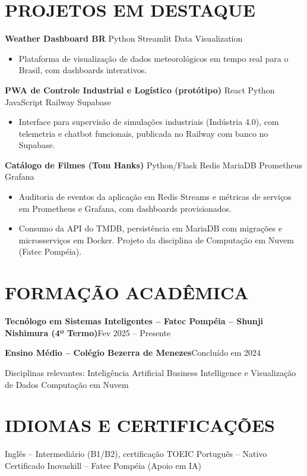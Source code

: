 \documentclass[9pt,a4paper]{extarticle}
\newcommand{\entry}[2]{\vspace{2pt}\noindent\textbf{#1}\hfill{\color{gray}#2}\par}
\newcommand{\projtitle}[2]{\vspace{2pt}\noindent\textbf{#1} {\color{gray}\textperiodcentered{} #2}\par}
\begin{document}
\section*{PROJETOS EM DESTAQUE}
\projtitle{Weather Dashboard BR}{Python \textperiodcentered{} Streamlit \textperiodcentered{} Data Visualization}
\begin{itemize}
  \item Plataforma de visualização de dados meteorológicos em tempo real para o Brasil, com dashboards interativos.
\end{itemize}
\projtitle{PWA de Controle Industrial e Logístico (protótipo)}{React \textperiodcentered{} Python \textperiodcentered{} JavaScript \textperiodcentered{} Railway \textperiodcentered{} Supabase}
\begin{itemize}
  \item Interface para supervisão de simulações industriais (Indústria 4.0), com telemetria e chatbot funcionais, publicada no Railway com banco no Supabase.
\end{itemize}
\projtitle{Catálogo de Filmes (Tom Hanks)}{Python/Flask \textperiodcentered{} Redis \textperiodcentered{} MariaDB \textperiodcentered{} Prometheus \textperiodcentered{} Grafana}
\begin{itemize}
  \item Auditoria de eventos da aplicação em Redis Streams e métricas de serviços em Prometheus e Grafana, com dashboards provisionados.
  \item Consumo da API do TMDB, persistência em MariaDB com migrações e microsserviços em Docker. Projeto da disciplina de Computação em Nuvem (Fatec Pompéia).
\end{itemize}

\section*{FORMAÇÃO ACADÊMICA}
\entry{Tecnólogo em Sistemas Inteligentes – Fatec Pompéia – Shunji Nishimura (4º Termo)}{Fev 2025 – Presente}
\entry{Ensino Médio – Colégio Bezerra de Menezes}{Concluído em 2024}
{\color{gray}Disciplinas relevantes: Inteligência Artificial \textperiodcentered{} Business Intelligence e Visualização de Dados \textperiodcentered{} Computação em Nuvem}

\section*{IDIOMAS E CERTIFICAÇÕES}
Inglês – Intermediário (B1/B2), certificação TOEIC \textperiodcentered{} Português – Nativo \textperiodcentered{} Certificado Inovaskill – Fatec Pompéia (Apoio em IA)
\end{document}
